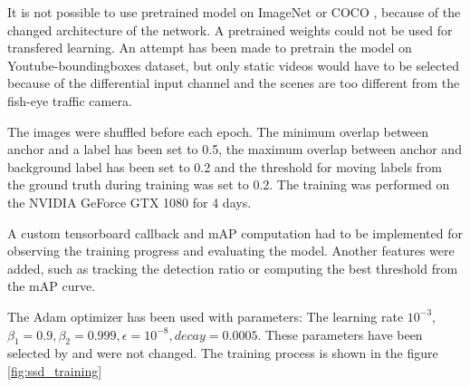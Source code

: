\documentclass[a4paper,12pt,titlepage]{article}
\numberwithin{figure}{section}
\begin{document}
It is not possible to use pretrained model on ImageNet\cite{deng2009imagenet} or COCO \cite{lin2014microsoft}, because of the changed architecture of the network. A pretrained weights could not be used for transfered learning. An attempt has been made to pretrain the model on Youtube-boundingboxes dataset\cite{real2017youtube}, but only static videos would have to be selected because of the differential input channel and the scenes are too different from the fish-eye traffic camera.

The images were shuffled before each epoch. The minimum overlap between anchor and a label has been set to 0.5, the maximum overlap between anchor and background label has been set to 0.2 and the threshold for moving labels from the ground truth during training was set to 0.2. The training was performed on the NVIDIA GeForce GTX 1080 for 4 days.

A custom tensorboard callback and mAP computation had to be implemented for observing the training progress and evaluating the model. Another features were added, such as tracking the  detection ratio or computing the best threshold from the mAP curve. 

The Adam optimizer \cite{kingma2014adam} has been used with parameters: The learning rate $10^{-3}$, $\beta_1 = 0.9, \beta_2 = 0.999, \epsilon=10^{-8}, decay = 0.0005$. These parameters have been selected by \cite{ssd_keras} and were not changed. The training process is shown in the figure \ref{fig:ssd_training}
\end{document}
